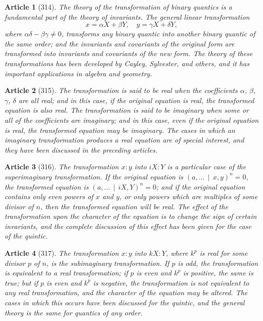 \documentclass[11pt,a4paper]{article}
\theoremstyle{cayley}
\newtheorem{art}{Article}
\begin{document}
\begin{art}[314]
The theory of the transformation of binary quantics is a fundamental part of the theory of invariants. The general linear transformation
\[
x = \alpha X + \beta Y, \quad y = \gamma X + \delta Y,
\]
where $\alpha\delta - \beta\gamma \neq 0$, transforms any binary quantic into another binary quantic of the same order; and the invariants and covariants of the original form are transformed into invariants and covariants of the new form. The theory of these transformations has been developed by Cayley, Sylvester, and others, and it has important applications in algebra and geometry.
\end{art}

\begin{art}[315]
The transformation is said to be real when the coefficients $\alpha$, $\beta$, $\gamma$, $\delta$ are all real; and in this case, if the original equation is real, the transformed equation is also real. The transformation is said to be imaginary when some or all of the coefficients are imaginary; and in this case, even if the original equation is real, the transformed equation may be imaginary. The cases in which an imaginary transformation produces a real equation are of special interest, and they have been discussed in the preceding articles.
\end{art}

\begin{art}[316]
The transformation $x:y$ into $iX:Y$ is a particular case of the superimaginary transformation. If the original equation is $(a, \ldots \,\mid\, x, y)^n = 0$, the transformed equation is $(a, \ldots \,\mid\, iX, Y)^n = 0$; and if the original equation contains only even powers of $x$ and $y$, or only powers which are multiples of some divisor of $n$, then the transformed equation will be real. The effect of the transformation upon the character of the equation is to change the sign of certain invariants, and the complete discussion of this effect has been given for the case of the quintic.
\end{art}

\begin{art}[317]
The transformation $x:y$ into $kX:Y$, where $k^p$ is real for some divisor $p$ of $n$, is the subimaginary transformation. If $p$ is odd, the transformation is equivalent to a real transformation; if $p$ is even and $k^p$ is positive, the same is true; but if $p$ is even and $k^p$ is negative, the transformation is not equivalent to any real transformation, and the character of the equation may be altered. The cases in which this occurs have been discussed for the quintic, and the general theory is the same for quantics of any order.
\end{art}
\end{document}
